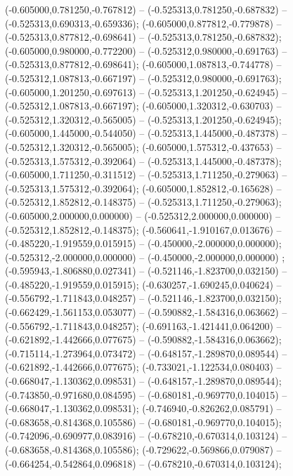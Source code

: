  (-0.605000,0.781250,-0.767812) -- (-0.525313,0.781250,-0.687832) -- (-0.525313,0.690313,-0.659336);
 (-0.605000,0.877812,-0.779878) -- (-0.525313,0.877812,-0.698641) -- (-0.525313,0.781250,-0.687832);
 (-0.605000,0.980000,-0.772200) -- (-0.525312,0.980000,-0.691763) -- (-0.525313,0.877812,-0.698641);
 (-0.605000,1.087813,-0.744778) -- (-0.525312,1.087813,-0.667197) -- (-0.525312,0.980000,-0.691763);
 (-0.605000,1.201250,-0.697613) -- (-0.525313,1.201250,-0.624945) -- (-0.525312,1.087813,-0.667197);
 (-0.605000,1.320312,-0.630703) -- (-0.525312,1.320312,-0.565005) -- (-0.525313,1.201250,-0.624945);
 (-0.605000,1.445000,-0.544050) -- (-0.525313,1.445000,-0.487378) -- (-0.525312,1.320312,-0.565005);
 (-0.605000,1.575312,-0.437653) -- (-0.525313,1.575312,-0.392064) -- (-0.525313,1.445000,-0.487378);
 (-0.605000,1.711250,-0.311512) -- (-0.525313,1.711250,-0.279063) -- (-0.525313,1.575312,-0.392064);
 (-0.605000,1.852812,-0.165628) -- (-0.525312,1.852812,-0.148375) -- (-0.525313,1.711250,-0.279063);
 (-0.605000,2.000000,0.000000) -- (-0.525312,2.000000,0.000000) -- (-0.525312,1.852812,-0.148375);
 (-0.560641,-1.910167,0.013676) -- (-0.485220,-1.919559,0.015915) -- (-0.450000,-2.000000,0.000000);
 (-0.525312,-2.000000,0.000000) -- (-0.450000,-2.000000,0.000000) ;
 (-0.595943,-1.806880,0.027341) -- (-0.521146,-1.823700,0.032150) -- (-0.485220,-1.919559,0.015915);
 (-0.630257,-1.690245,0.040624) -- (-0.556792,-1.711843,0.048257) -- (-0.521146,-1.823700,0.032150);
 (-0.662429,-1.561153,0.053077) -- (-0.590882,-1.584316,0.063662) -- (-0.556792,-1.711843,0.048257);
 (-0.691163,-1.421441,0.064200) -- (-0.621892,-1.442666,0.077675) -- (-0.590882,-1.584316,0.063662);
 (-0.715114,-1.273964,0.073472) -- (-0.648157,-1.289870,0.089544) -- (-0.621892,-1.442666,0.077675);
 (-0.733021,-1.122534,0.080403) -- (-0.668047,-1.130362,0.098531) -- (-0.648157,-1.289870,0.089544);
 (-0.743850,-0.971680,0.084595) -- (-0.680181,-0.969770,0.104015) -- (-0.668047,-1.130362,0.098531);
 (-0.746940,-0.826262,0.085791) -- (-0.683658,-0.814368,0.105586) -- (-0.680181,-0.969770,0.104015);
 (-0.742096,-0.690977,0.083916) -- (-0.678210,-0.670314,0.103124) -- (-0.683658,-0.814368,0.105586);
 (-0.729622,-0.569866,0.079087) -- (-0.664254,-0.542864,0.096818) -- (-0.678210,-0.670314,0.103124);
